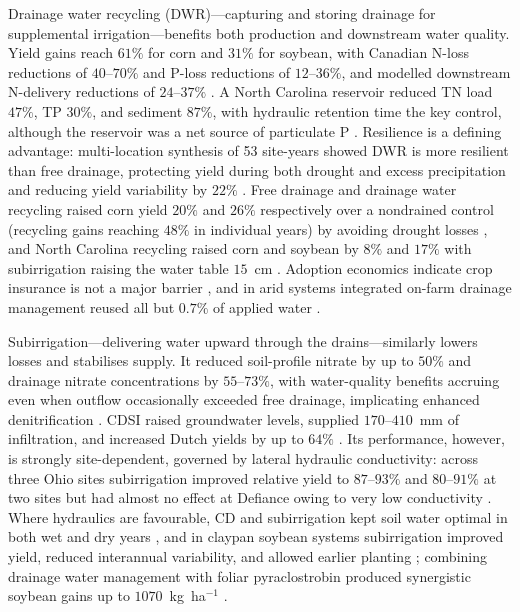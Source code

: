 \documentclass[11pt]{article}
\begin{document}
Drainage water recycling (DWR)---capturing and storing drainage for
supplemental irrigation---benefits both production and downstream water
quality. Yield gains reach $61\%$ for corn and $31\%$ for soybean, with
Canadian N-loss reductions of $40$--$70\%$ and P-loss reductions of
$12$--$36\%$, and modelled downstream N-delivery reductions of $24$--$37\%$
\parencite{Hay2021}. A North Carolina reservoir reduced TN load $47\%$, TP
$30\%$, and sediment $87\%$, with hydraulic retention time the key control,
although the reservoir was a net source of particulate P
\parencite{Moursi2023,Moursi2022}. Resilience is a defining advantage:
multi-location synthesis of 53 site-years showed DWR is more resilient than
free drainage, protecting yield during both drought and excess precipitation
and reducing yield variability by $22\%$ \parencite{Willison2021}. Free
drainage and drainage water recycling raised corn yield $20\%$ and $26\%$
respectively over a nondrained control (recycling gains reaching $48\%$ in
individual years) by avoiding drought losses \parencite{Kaur2021}, and North
Carolina recycling
raised corn and soybean by $8\%$ and $17\%$ with subirrigation raising the
water table $15$~cm \parencite{Moursi2024}. Adoption economics indicate crop
insurance is not a major barrier \parencite{Sellars2022}, and in arid systems
integrated on-farm drainage management reused all but $0.7\%$ of applied water
\parencite{Ayars2014,Kosari2024}.

Subirrigation---delivering water upward through the drains---similarly lowers
losses and stabilises supply. It reduced soil-profile nitrate by up to $50\%$
and drainage nitrate concentrations by $55$--$73\%$, with water-quality
benefits accruing even when outflow occasionally exceeded free drainage,
implicating enhanced denitrification \parencite{Elmi2004,Elmi2002,Noory2009}.
CDSI raised groundwater levels, supplied $170$--$410$~mm of infiltration, and
increased Dutch yields by up to $64\%$
\parencite{deWit2022,deWit2024,FAUSEY1995,Almen2021,Madramootoo2007}. Its
performance, however, is strongly site-dependent, governed by lateral hydraulic
conductivity: across three Ohio sites subirrigation improved relative yield to
$87$--$93\%$ and $80$--$91\%$ at two sites but had almost no effect at Defiance
owing to very low conductivity \parencite{Gunn2018,Gunn2019}. Where hydraulics
are favourable, CD and subirrigation kept soil water optimal in both wet and
dry years \parencite{Niaghi2019}, and in claypan soybean systems subirrigation
improved yield, reduced interannual variability, and allowed earlier planting
\parencite{Nelson2011}; combining drainage water management with foliar
pyraclostrobin produced synergistic soybean gains up to $1070$~kg~ha$^{-1}$
\parencite{Nelson2011b}.
\end{document}
